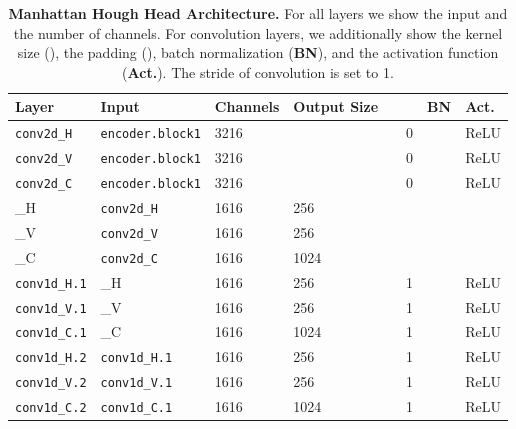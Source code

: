 \documentclass[runningheads]{llncs}
\begin{document}
\begin{table*}[!t]
\centering


\begin{tabu} to \textwidth {X[4,c]X[5,c]X[3,c]X[3,c]X[2,c]X[1,c]X[1,c]X[2,c]}
\toprule
\textbf{Layer}             & \textbf{Input}             & \textbf{Channels}          & \textbf{Output Size}     &  &  & \textbf{BN}           & \textbf{Act.} \\ \midrule
\texttt{conv2d\_H}         & \texttt{encoder.block1}    & 3216 &  &    & 0            &  & ReLU \\ \midrule
\texttt{conv2d\_V}         & \texttt{encoder.block1}    & 3216 &  &    & 0            &  & ReLU \\ \midrule
\texttt{conv2d\_C}         & \texttt{encoder.block1}    & 3216 &  &    & 0            &  & ReLU \\ \midrule
\_H & \texttt{conv2d\_H}         & 1616                & 256             &              &              &              &      \\ \midrule
\_V & \texttt{conv2d\_V}         & 1616                & 256             &              &              &              &      \\ \midrule
\_C & \texttt{conv2d\_C}         & 1616                & 1024            &              &              &              &      \\ \midrule
\texttt{conv1d\_H.1}       & \_H & 1616                & 256             &           & 1            &  & ReLU \\ \midrule
\texttt{conv1d\_V.1}       & \_V & 1616                & 256             &           & 1            &  & ReLU \\ \midrule
\texttt{conv1d\_C.1}       & \_C & 1616                & 1024            &           & 1            &  & ReLU \\ \midrule
\texttt{conv1d\_H.2}       & \texttt{conv1d\_H.1}       & 1616                & 256             &           & 1            &  & ReLU \\ \midrule
\texttt{conv1d\_V.2}       & \texttt{conv1d\_V.1}       & 1616                & 256             &           & 1            &  & ReLU \\ \midrule
\texttt{conv1d\_C.2}       & \texttt{conv1d\_C.1}       & 1616                & 1024            &           & 1            &  & ReLU \\ \bottomrule
\end{tabu}
\caption{\textbf{Manhattan Hough Head Architecture.} For all layers we show the input and the number of channels. For convolution layers, we additionally show the kernel size (), the padding (), batch normalization (\textbf{BN}), and the activation function (\textbf{Act.}). The stride of convolution is set to 1.}
\label{tab:hough_head}
\end{table*}
\end{document}
